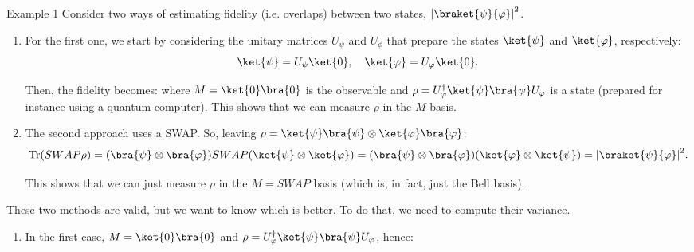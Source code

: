 \documentclass[a4paper]{article}
\begin{document}
\begin{parag}{Example 1}
    Consider two ways of estimating fidelity (i.e. overlaps) between two states, $\left|\braket{\psi}{\phi}\right|^2$. 
    \begin{enumerate}[left=0pt]
        \item For the first one, we start by considering the unitary matrices $U_{\psi}$ and $U_{\phi}$ that prepare the states $\ket{\psi}$ and $\ket{\phi}$, respectively:
        \[\ket{\psi} = U_{\psi}\ket{0}, \mathspace \ket{\phi} = U_{\phi} \ket{0}.\]

        Then, the fidelity becomes: 
        where $M = \ket{0}\bra{0}$ is the observable and $\rho = U_{\phi}^{\dagger} \ket{\psi}\bra{\psi} U_{\phi}$ is a state (prepared for instance using a quantum computer). This shows that we can measure $\rho$ in the $M$ basis.
        
        \item The second approach uses a SWAP. So, leaving $\rho = \ket{\psi}\bra{\psi} \otimes \ket{\phi}\bra{\phi}$:
        \[\Tr\left(SWAP \rho\right) = \left(\bra{\psi}\otimes \bra{\phi}\right) SWAP \left(\ket{\psi} \otimes \ket{\phi}\right) = \left(\bra{\psi} \otimes \bra{\phi}\right)\left(\ket{\phi} \otimes \ket{\psi}\right) = \left|\braket{\psi}{\phi}\right|^2.\]

        This shows that we can just measure $\rho$ in the $M = SWAP$ basis (which is, in fact, just the Bell basis).
    \end{enumerate}

    These two methods are valid, but we want to know which is better. To do that, we need to compute their variance.
    \begin{enumerate}[left=0pt]
        \item In the first case, $M = \ket{0}\bra{0}$ and $\rho = U_{\phi}^{\dagger} \ket{\psi}\bra{\psi} U_{\phi}$, hence:
        

\end{enumerate}
\end{parag}
\end{document}
